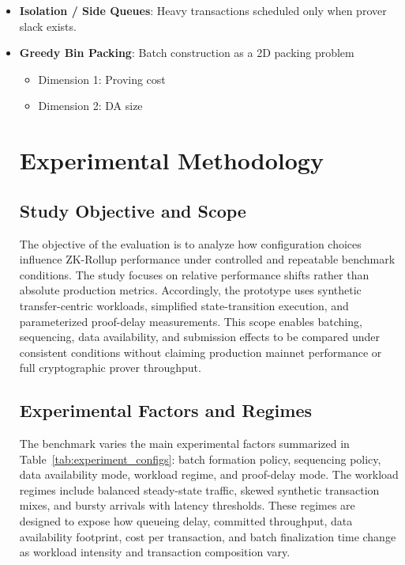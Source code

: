 \begin{itemize}[leftmargin=1.5em]
    \item \textbf{Isolation / Side Queues}: Heavy transactions scheduled only when prover slack exists.
    \item \textbf{Greedy Bin Packing}: Batch construction as a 2D packing problem
    \begin{itemize}
        \item Dimension 1: Proving cost
        \item Dimension 2: DA size
    \end{itemize}

\section{Experimental Methodology}

\subsection{Study Objective and Scope}

The objective of the evaluation is to analyze how configuration choices influence ZK-Rollup performance under controlled and repeatable benchmark conditions. The study focuses on relative performance shifts rather than absolute production metrics. Accordingly, the prototype uses synthetic transfer-centric workloads, simplified state-transition execution, and parameterized proof-delay measurements. This scope enables batching, sequencing, data availability, and submission effects to be compared under consistent conditions without claiming production mainnet performance or full cryptographic prover throughput.



\subsection{Experimental Factors and Regimes}

The benchmark varies the main experimental factors summarized in Table~\ref{tab:experiment_configs}: batch formation policy, sequencing policy, data availability mode, workload regime, and proof-delay mode. The workload regimes include balanced steady-state traffic, skewed synthetic transaction mixes, and bursty arrivals with latency thresholds. These regimes are designed to expose how queueing delay, committed throughput, data availability footprint, cost per transaction, and batch finalization time change as workload intensity and transaction composition vary.


\end{itemize}
